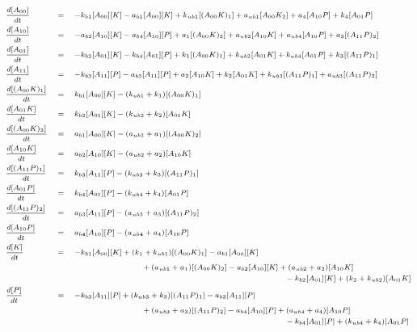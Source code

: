 \documentclass[9pt,lineno]{elife}
\begin{document}
\begin{appendixbox}
\begin{equation}
\scriptsize{
    \begin{alignedat}{3}
        & \frac{d[A_{00}]}{dt} \quad &&= \quad -k_{b1}[A_{00}][K]-a_{b1}[A_{00}][K]+k_{ub1}[(A_{00}K)_1]+a_{ub1}[A_{00}K_2]+a_4[A_{10}P]+k_4[A_{01}P] && \\  
        & \frac{d[A_{10}]}{dt} \quad &&= \quad -a_{b2}[A_{10}][K]-a_{b4}[A_{10}][P]+a_1[(A_{00}K)_2]+a_{ub2}[A_{10}K]+a_{ub4}[A_{10}P]+a_3[(A_{11}P)_2] && \\  
        & \frac{d[A_{01}]}{dt} \quad &&= \quad -k_{b2}[A_{01}][K]-k_{b4}[A_{01}][P]+k_1[(A_{00}K)_1]+k_{ub2}[A_{01}K]+k_{ub4}[A_{01}P]+k_3[(A_{11}P)_1] && \\  
        & \frac{d[A_{11}]}{dt} \quad &&= \quad -k_{b3}[A_{11}][P]-a_{b3}[A_{11}][P]+a_2[A_{10}K]+k_2[A_{01}K]+k_{ub3}[(A_{11}P)_1]+a_{ub3}[(A_{11}P)_2] && \\  
        & \frac{d[(A_{00}K)_1]}{dt} \quad &&= \quad k_{b1}[A_{00}][K]-(k_{ub1}+k_1)[(A_{00}K)_1] && \\  
        & \frac{d[A_{01}K]}{dt} \quad &&= \quad k_{b2}[A_{01}][K]-(k_{ub2}+k_2)[A_{01}K] && \\  
        & \frac{d[(A_{00}K)_2]}{dt} \quad &&= \quad a_{b1}[A_{00}][K]-(a_{ub1}+a_1)[(A_{00}K)_2] && \\  
        & \frac{d[A_{10}K]}{dt} \quad &&= \quad a_{b2}[A_{10}][K]-(a_{ub2}+a_2)[A_{10}K] && \\  
        & \frac{d[(A_{11}P)_1]}{dt} \quad &&= \quad k_{b3}[A_{11}][P]-(k_{ub3}+k_3)[(A_{11}P)_1] && \\  
        & \frac{d[A_{01}P]}{dt} \quad &&= \quad k_{b4}[A_{01}][P]-(k_{ub4}+k_4)[A_{01}P] && \\  
        & \frac{d[(A_{11}P)_2]}{dt} \quad &&= \quad a_{b3}[A_{11}][P]-(a_{ub3}+a_3)[(A_{11}P)_2] && \\  
        & \frac{d[A_{10}P]}{dt} \quad &&= \quad a_{b4}[A_{10}][P]-(a_{ub4}+a_4)[A_{10}P] && \\  
        & \frac{d[K]}{dt} \quad &&= \quad -k_{b1}[A_{00}][K]+(k_1+k_{ub1})[(A_{00}K)_1]-a_{b1}[A_{00}][K] && \\
        & && \hspace{30mm}  +(a_{ub1}+a_1)[(A_{00}K)_2]-a_{b2}[A_{10}][K]+(a_{ub2}+a_2)[A_{10}K] && \\
        & && \hspace{80mm} -k_{b2}[A_{01}][K]+(k_2+k_{ub2})[A_{01}K] && \\ 
        & \frac{d[P]}{dt} \quad &&= \quad -k_{b3}[A_{11}][P]+(k_{ub3}+k_3)[(A_{11}P)_1]-a_{b3}[A_{11}][P] && \\
        & && \hspace{30mm} +(a_{ub3}+a_3)[(A_{11}P)_2]-a_{b4}[A_{10}][P]+(a_{ub4}+a_4)[A_{10}P] && \\
        & && \hspace{80mm} -k_{b4}[A_{01}][P]+(k_{ub4}+k_4)[A_{01}P] && \\ 
    \end{alignedat}}
\end{equation} 


\end{appendixbox}
\end{document}
